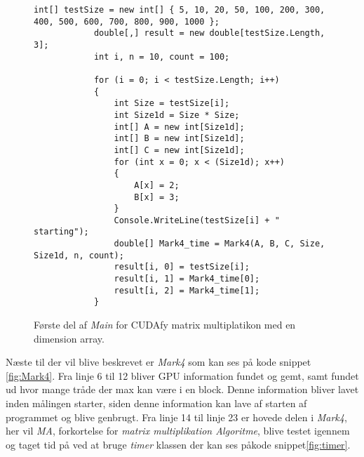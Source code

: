 \begin{figure}[!ht]
    \centering
    \lstset{style=sharpc}
	\begin{lstlisting}
int[] testSize = new int[] { 5, 10, 20, 50, 100, 200, 300, 400, 500, 600, 700, 800, 900, 1000 };
            double[,] result = new double[testSize.Length, 3];
            int i, n = 10, count = 100;
            
            for (i = 0; i < testSize.Length; i++)
            {
                int Size = testSize[i];
                int Size1d = Size * Size;
                int[] A = new int[Size1d];
                int[] B = new int[Size1d];
                int[] C = new int[Size1d];
                for (int x = 0; x < (Size1d); x++)
                {
                    A[x] = 2;
                    B[x] = 3;
                }
                Console.WriteLine(testSize[i] + " starting");
                double[] Mark4_time = Mark4(A, B, C, Size, Size1d, n, count);
                result[i, 0] = testSize[i];
                result[i, 1] = Mark4_time[0];
                result[i, 2] = Mark4_time[1];
            }
	\end{lstlisting}
    \caption{Første del af \textit{Main} for CUDAfy matrix multiplatikon med en dimension array.}
    \label{fig:MainPart1}
\end{figure}

Næste til der vil blive beskrevet er \textit{Mark4} som kan ses på kode snippet \ref{fig:Mark4}. Fra linje 6 til 12 bliver GPU information fundet og gemt, samt fundet ud hvor mange tråde der max kan være i en block. Denne information bliver lavet inden målingen starter, siden denne information kan lave af starten af programmet og blive genbrugt. Fra linje 14 til linje 23 er hovede delen i \textit{Mark4}, her vil \textit{MA}, forkortelse for \textit{matrix multiplikation Algoritme}, blive testet igennem og taget tid på ved at bruge \textit{timer} klassen der kan ses påkode snippet\ref{fig:timer}.

